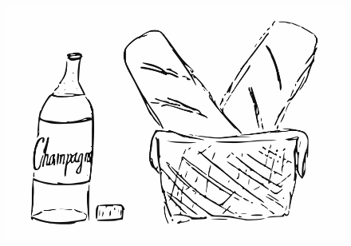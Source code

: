 \clearpage
\begin{figure}[!b]
\begin{center}
\includegraphics[scale=0.5]{../bilder/batongochvin.png} 
\end{center}
\end{figure}

